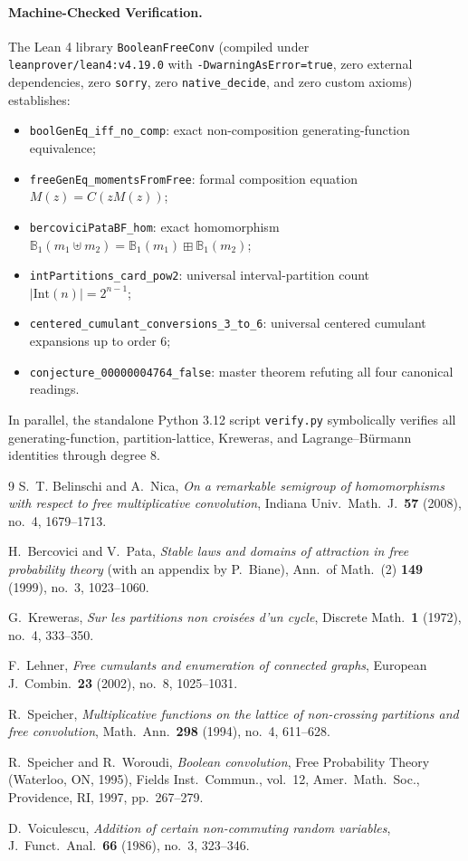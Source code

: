 \documentclass[11pt,a4paper]{article}
\theoremstyle{definition}
\theoremstyle{remark}
\newcommand{\IntP}{\mathrm{Int}}
\newcommand{\BP}{\mathbb{B}_1}
\begin{document}
\paragraph{Machine-Checked Verification.}
The Lean 4 library \texttt{BooleanFreeConv} (compiled under \texttt{leanprover/lean4:v4.19.0} with \texttt{-DwarningAsError=true}, zero external dependencies, zero \texttt{sorry}, zero \texttt{native\_decide}, and zero custom axioms) establishes:
\begin{itemize}
  \item \texttt{boolGenEq\_iff\_no\_comp}: exact non-composition generating-function equivalence;
  \item \texttt{freeGenEq\_momentsFromFree}: formal composition equation $M(z) = C(z M(z))$;
  \item \texttt{bercoviciPataBF\_hom}: exact homomorphism $\BP(m_1 \uplus m_2) = \BP(m_1) \boxplus \BP(m_2)$;
  \item \texttt{intPartitions\_card\_pow2}: universal interval-partition count $|\IntP(n)| = 2^{n-1}$;
  \item \texttt{centered\_cumulant\_conversions\_3\_to\_6}: universal centered cumulant expansions up to order $6$;
  \item \texttt{conjecture\_00000004764\_false}: master theorem refuting all four canonical readings.
\end{itemize}
In parallel, the standalone Python 3.12 script \texttt{verify.py} symbolically verifies all generating-function, partition-lattice, Kreweras, and Lagrange--B\"urmann identities through degree $8$.

\begin{thebibliography}{9}
S.~T. Belinschi and A.~Nica, \emph{On a remarkable semigroup of homomorphisms with respect to free multiplicative convolution}, Indiana Univ.\ Math.\ J.\ \textbf{57} (2008), no.~4, 1679--1713.

H.~Bercovici and V.~Pata, \emph{Stable laws and domains of attraction in free probability theory} (with an appendix by P.~Biane), Ann.\ of Math.\ (2) \textbf{149} (1999), no.~3, 1023--1060.

G.~Kreweras, \emph{Sur les partitions non crois\'ees d'un cycle}, Discrete Math.\ \textbf{1} (1972), no.~4, 333--350.

F.~Lehner, \emph{Free cumulants and enumeration of connected graphs}, European J.\ Combin.\ \textbf{23} (2002), no.~8, 1025--1031.

R.~Speicher, \emph{Multiplicative functions on the lattice of non-crossing partitions and free convolution}, Math.\ Ann.\ \textbf{298} (1994), no.~4, 611--628.

R.~Speicher and R.~Woroudi, \emph{Boolean convolution}, Free Probability Theory (Waterloo, ON, 1995), Fields Inst.\ Commun., vol.~12, Amer.\ Math.\ Soc., Providence, RI, 1997, pp.~267--279.

D.~Voiculescu, \emph{Addition of certain non-commuting random variables}, J.\ Funct.\ Anal.\ \textbf{66} (1986), no.~3, 323--346.
\end{thebibliography}
\end{document}
